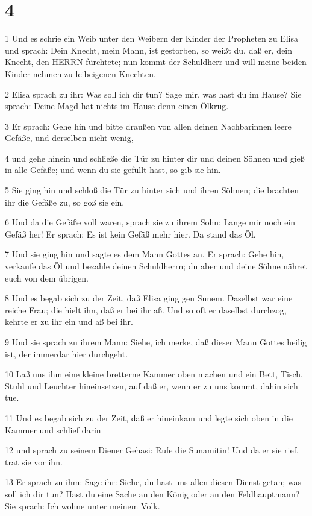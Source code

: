 \chapter{4}

\par 1 Und es schrie ein Weib unter den Weibern der Kinder der Propheten zu Elisa und sprach: Dein Knecht, mein Mann, ist gestorben, so weißt du, daß er, dein Knecht, den HERRN fürchtete; nun kommt der Schuldherr und will meine beiden Kinder nehmen zu leibeigenen Knechten.
\par 2 Elisa sprach zu ihr: Was soll ich dir tun? Sage mir, was hast du im Hause? Sie sprach: Deine Magd hat nichts im Hause denn einen Ölkrug.
\par 3 Er sprach: Gehe hin und bitte draußen von allen deinen Nachbarinnen leere Gefäße, und derselben nicht wenig,
\par 4 und gehe hinein und schließe die Tür zu hinter dir und deinen Söhnen und gieß in alle Gefäße; und wenn du sie gefüllt hast, so gib sie hin.
\par 5 Sie ging hin und schloß die Tür zu hinter sich und ihren Söhnen; die brachten ihr die Gefäße zu, so goß sie ein.
\par 6 Und da die Gefäße voll waren, sprach sie zu ihrem Sohn: Lange mir noch ein Gefäß her! Er sprach: Es ist kein Gefäß mehr hier. Da stand das Öl.
\par 7 Und sie ging hin und sagte es dem Mann Gottes an. Er sprach: Gehe hin, verkaufe das Öl und bezahle deinen Schuldherrn; du aber und deine Söhne nähret euch von dem übrigen.
\par 8 Und es begab sich zu der Zeit, daß Elisa ging gen Sunem. Daselbst war eine reiche Frau; die hielt ihn, daß er bei ihr aß. Und so oft er daselbst durchzog, kehrte er zu ihr ein und aß bei ihr.
\par 9 Und sie sprach zu ihrem Mann: Siehe, ich merke, daß dieser Mann Gottes heilig ist, der immerdar hier durchgeht.
\par 10 Laß uns ihm eine kleine bretterne Kammer oben machen und ein Bett, Tisch, Stuhl und Leuchter hineinsetzen, auf daß er, wenn er zu uns kommt, dahin sich tue.
\par 11 Und es begab sich zu der Zeit, daß er hineinkam und legte sich oben in die Kammer und schlief darin
\par 12 und sprach zu seinem Diener Gehasi: Rufe die Sunamitin! Und da er sie rief, trat sie vor ihn.
\par 13 Er sprach zu ihm: Sage ihr: Siehe, du hast uns allen diesen Dienst getan; was soll ich dir tun? Hast du eine Sache an den König oder an den Feldhauptmann? Sie sprach: Ich wohne unter meinem Volk.
